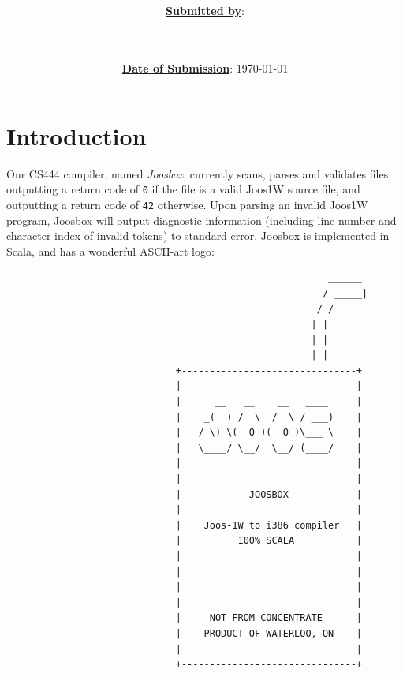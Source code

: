 \documentclass[letterpaper]{article}
\title{\course \\ \term \\ \project}
\date{\ul{\textbf{Date of Submission}}: \today}
\author{\ul{\textbf{Submitted by}}: \\ \indent \wenhao \\ \indent \chris \\ \indent \peter}
\begin{document}
  \maketitle
  \thispagestyle{empty}
  \clearpage

  \setcounter{page}{1}

  \clearpage
  \section{Introduction}

  Our CS444 compiler, named {\em Joosbox}, currently scans, parses and validates
  files, outputting a return code of {\tt 0} if the file is a valid Joos1W source
  file, and outputting a return code of {\tt 42} otherwise. Upon parsing an invalid
  Joos1W program, Joosbox will output diagnostic information (including line
  number and character index of invalid tokens) to standard error. Joosbox is
  implemented in Scala, and has a wonderful ASCII-art logo:

  \begin{verbatim}
                                                         ______
                                                        / _____|
                                                       / /
                                                      | |
                                                      | |
                                                      | |
                              +-------------------------------+
                              |                               |
                              |      __   __    __   ____     |
                              |    _(  ) /  \  /  \ / ___)    |
                              |   / \) \(  O )(  O )\___ \    |
                              |   \____/ \__/  \__/ (____/    |
                              |                               |
                              |                               |
                              |            JOOSBOX            |
                              |                               |
                              |    Joos-1W to i386 compiler   |
                              |          100% SCALA           |
                              |                               |
                              |                               |
                              |                               |
                              |                               |
                              |     NOT FROM CONCENTRATE      |
                              |    PRODUCT OF WATERLOO, ON    |
                              |                               |
                              +-------------------------------+
  \end{verbatim}
\end{document}
